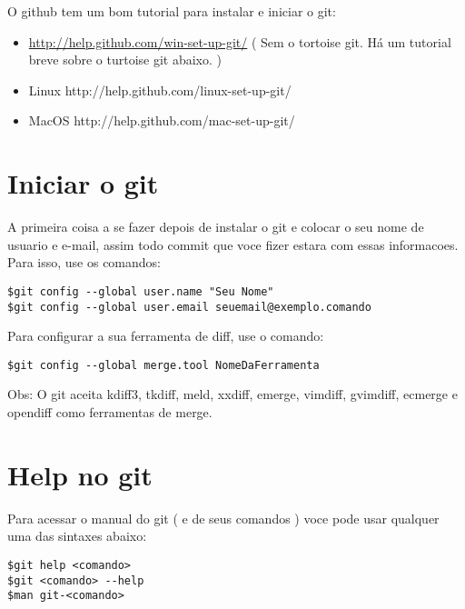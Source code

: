 \documentclass{article}
\begin{document}
	O github tem um bom tutorial para instalar e iniciar o git:
	\begin{itemize}
    \item \href{Windows}{http://help.github.com/win-set-up-git/} ( Sem o tortoise git. Há um
                    tutorial breve sobre o turtoise git abaixo. ) 
    \item Linux     http://help.github.com/linux-set-up-git/
    \item MacOS     http://help.github.com/mac-set-up-git/
    \end{itemize}
    
\section{Iniciar o git}
    A primeira coisa a se fazer depois de instalar o git e colocar o seu nome de
usuario e e-mail, assim todo commit que voce fizer estara com essas informacoes.
Para isso, use os comandos:

\begin{tabbing}
\hspace{1cm}\=   \verb#$git config --global user.name "Seu Nome"# \\
            \>   \verb#$git config --global user.email seuemail@exemplo.comando#
\end{tabbing}
    Para configurar a sua ferramenta de diff, use o comando:

\begin{tabbing}
\hspace{1cm}\=   \verb#$git config --global merge.tool NomeDaFerramenta#
\end{tabbing}

Obs: O git aceita kdiff3, tkdiff, meld, xxdiff, emerge, vimdiff, gvimdiff, ecmerge
e opendiff como ferramentas de merge.

\section{Help no git}
    Para acessar o manual do git ( e de seus comandos ) voce pode usar qualquer
uma das sintaxes abaixo:

\begin{tabbing}
\hspace{1cm}\=  \verb#$git help <comando>#\\
            \>  \verb#$git <comando> --help#\\
            \>  \verb#$man git-<comando>#
\end{tabbing}
\end{document}
